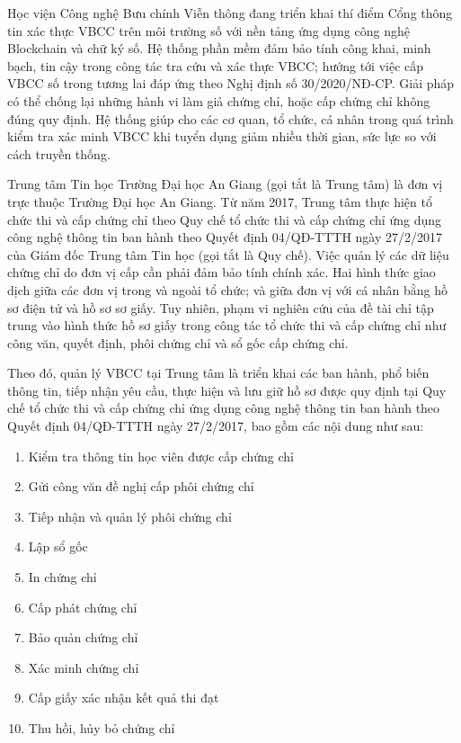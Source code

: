 Học viện Công nghệ Bưu chính Viễn thông đang triển khai thí điểm Cổng thông tin xác thực VBCC trên môi trường số với nền tảng ứng dụng công nghệ Blockchain và chữ ký số. Hệ thống phần mềm đảm bảo tính công khai, minh bạch, tin cậy trong công tác tra cứu và xác thực VBCC; hướng tới việc cấp VBCC số trong tương lai đáp ứng theo Nghị định số 30/2020/NĐ-CP. Giải pháp có thể chống lại những hành vi làm giả chứng chỉ, hoặc cấp chứng chỉ không đúng quy định. Hệ thống giúp cho các cơ quan, tổ chức, cá nhân trong quá trình kiểm tra xác minh VBCC khi tuyển dụng giảm nhiều thời gian, sức lực so với cách truyền thống.

Trung tâm Tin học Trường Đại học An Giang (gọi tắt là Trung tâm) là đơn vị trực thuộc Trường Đại học An Giang. Từ năm 2017, Trung tâm thực hiện tổ chức thi và cấp chứng chỉ theo Quy chế tổ chức thi và cấp chứng chỉ ứng dụng công nghệ thông tin ban hành theo Quyết định 04/QĐ-TTTH ngày 27/2/2017 của Giám đốc Trung tâm Tin học (gọi tắt là Quy chế). Việc quản lý các dữ liệu chứng chỉ do đơn vị cấp cần phải đảm bảo tính chính xác. Hai hình thức giao dịch giữa các đơn vị trong và ngoài tổ chức; và giữa đơn vị với cá nhân bằng hồ sơ điện tử và hồ sơ sơ giấy. Tuy nhiên, phạm vi nghiên cứu của đề tài chỉ tập trung vào hình thức hồ sơ giấy trong công tác tổ chức thi và cấp chứng chỉ như công văn, quyết định, phôi chứng chỉ và sổ gốc cấp chứng chỉ.

Theo đó, quản lý VBCC tại Trung tâm là triển khai các ban hành, phổ biến thông tin, tiếp nhận yêu cầu, thực hiện và lưu giữ hồ sơ được quy định tại Quy chế tổ chức thi và cấp chứng chỉ ứng dụng công nghệ thông tin ban hành theo Quyết định 04/QĐ-TTTH ngày 27/2/2017, bao gồm các nội dung như sau:

\begin{enumerate}
\item Kiểm tra thông tin học viên được cấp chứng chỉ
\item Gửi công văn đề nghị cấp phôi chứng chỉ
\item Tiếp nhận và quản lý phôi chứng chỉ
\item Lập sổ gốc
\item In chứng chỉ
\item Cấp phát chứng chỉ
\item Bảo quản chứng chỉ
\item Xác minh chứng chỉ
\item Cấp giấy xác nhận kết quả thi đạt
\item Thu hồi, hủy bỏ chứng chỉ
\end{enumerate}

